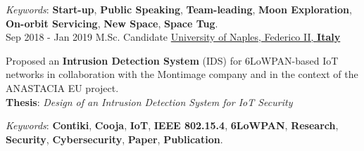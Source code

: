\documentclass[letterpaper]{twentysecondcv} %
\begin{document}
\begin{twenty}
{            \vspace{1 mm}
            \textit{Keywords}: \textbf{Start-up}, \textbf{Public Speaking}, \textbf{Team-leading}, \textbf{Moon Exploration}, \textbf{On-orbit Servicing}, \textbf{New Space}, \textbf{Space Tug}.
        }\\
	\twentyitem
    	{Sep 2018 -}
		{Jan 2019}
        {M.Sc. Candidate}
        {\href{http://www.scuolapsb.unina.it/}{University of Naples, Federico II, \textbf{Italy}}}
        {}
        {
           Proposed an \textbf{Intrusion Detection System} (IDS) for 6LoWPAN-based IoT networks in collaboration with the Montimage company and in the context of the ANASTACIA EU project.\\
            \textbf{Thesis}: \textit{Design of an Intrusion Detection System for IoT Security}

            \vspace{1 mm}
            \textit{Keywords}: \textbf{Contiki}, \textbf{Cooja}, \textbf{IoT}, \textbf{IEEE 802.15.4}, \textbf{6LoWPAN}, \textbf{Research}, \textbf{Security}, \textbf{Cybersecurity}, \textbf{Paper}, \textbf{Publication}.
        }
\end{twenty}
\end{document}
